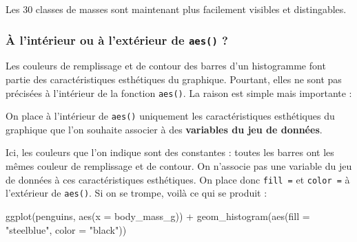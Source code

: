 \documentclass[
  a4paper,
  DIV=11,
  numbers=noendperiod,
  oneside]{scrreprt}
\newenvironment{Shaded}{}{}
\newcommand{\AttributeTok}[1]{\textcolor[rgb]{0.84,0.23,0.29}{#1}}
\newcommand{\FunctionTok}[1]{\textcolor[rgb]{0.44,0.26,0.76}{#1}}
\newcommand{\NormalTok}[1]{\textcolor[rgb]{0.14,0.16,0.18}{#1}}
\newcommand{\SpecialCharTok}[1]{\textcolor[rgb]{0.00,0.36,0.77}{#1}}
\newcommand{\StringTok}[1]{\textcolor[rgb]{0.01,0.18,0.38}{#1}}
\begin{document}
Les 30 classes de masses sont maintenant plus facilement visibles et
distingables.

\subsubsection{\texorpdfstring{À l'intérieur ou à l'extérieur de
\texttt{aes()}
?}{À l'intérieur ou à l'extérieur de aes() ?}}\label{uxe0-lintuxe9rieur-ou-uxe0-lextuxe9rieur-de-aes}

Les couleurs de remplissage et de contour des barres d'un histogramme
font partie des caractéristiques esthétiques du graphique. Pourtant,
elles ne sont pas précisées à l'intérieur de la fonction \texttt{aes()}.
La raison est simple mais importante :

\begin{tcolorbox}[enhanced jigsaw, coltitle=black, toprule=.15mm, opacityback=0, breakable, colback=white, opacitybacktitle=0.6, colframe=quarto-callout-important-color-frame, leftrule=.75mm, rightrule=.15mm, titlerule=0mm, bottomtitle=1mm, toptitle=1mm, arc=.35mm, title=\textcolor{quarto-callout-important-color}{\faExclamation}\hspace{0.5em}{Important}, colbacktitle=quarto-callout-important-color!10!white, bottomrule=.15mm, left=2mm]

On place à l'intérieur de \texttt{aes()} uniquement les caractéristiques
esthétiques du graphique que l'on souhaite associer à des
\textbf{variables du jeu de données}.

\end{tcolorbox}

Ici, les couleurs que l'on indique sont des constantes : toutes les
barres ont les mêmes couleur de remplissage et de contour. On n'associe
pas une variable du jeu de données à ces caractéristiques esthétiques.
On place donc \texttt{fill\ =} et \texttt{color\ =} à l'extérieur de
\texttt{aes()}. Si on se trompe, voilà ce qui se produit :

\begin{Shaded}
\begin{Highlighting}[]
\FunctionTok{ggplot}\NormalTok{(penguins, }\FunctionTok{aes}\NormalTok{(}\AttributeTok{x =}\NormalTok{ body\_mass\_g)) }\SpecialCharTok{+}
  \FunctionTok{geom\_histogram}\NormalTok{(}\FunctionTok{aes}\NormalTok{(}\AttributeTok{fill =} \StringTok{"steelblue"}\NormalTok{, }\AttributeTok{color =} \StringTok{"black"}\NormalTok{))}
\end{Highlighting}
\end{Shaded}
\end{document}
